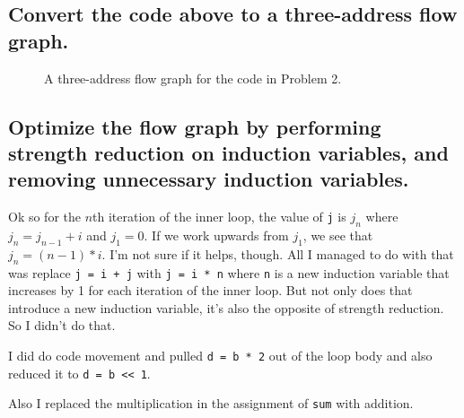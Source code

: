 \subsection{Convert the code above to a three-address flow graph.}
\begin{figure}[H]
\centering
	
\label{fig:2-b}
\caption{A three-address flow graph for the code in Problem 2.}
\end{figure}



\subsection{Optimize the flow graph by performing strength reduction on induction variables, and removing unnecessary induction variables.}

Ok so for the $n$th iteration of the inner loop, the value of \texttt{j} is $j_n$ where $j_n = j_{n-1} + i$ and $j_1 = 0$.
If we work upwards from $j_1$, we see that $j_n = (n-1)*i$.
I'm not sure if it helps, though.
All I managed to do with that was replace \texttt{j = i + j} with \texttt{j = i * n} where \texttt{n} is a new induction variable that increases by 1 for each iteration of the inner loop.
But not only does that introduce a new induction variable, it's also the opposite of strength reduction.
So I didn't do that.

I did do code movement and pulled \texttt{d = b * 2} out of the loop body and also reduced it to \texttt{d = b << 1}.

Also I replaced the multiplication in the assignment of \texttt{sum} with addition.
